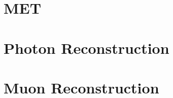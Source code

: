







\section{MET}
\label{sec:MET}

\section{Photon Reconstruction}
\label{sec:Photon}


\section{Muon Reconstruction}
\label{sec:Muon}


